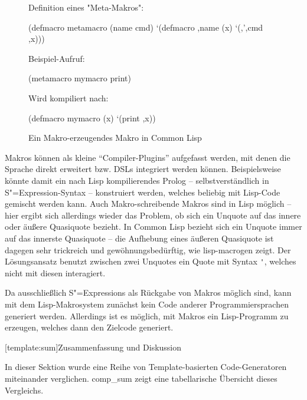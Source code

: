 \documentclass[11pt, a4paper, bibgerm]{scrbook}
\newenvironment{DIFnomarkup}{}{}
\newcommand\icode[1]{\lstinline?#1?}
\newcommand\lsection{}
\newcommand\abb{}
\newcommand{\sexp}{S"=Expression}
\newcommand{\sexps}{S"=Expressions}
\begin{document}
\begin{figure}[h]
  \centering
  \begin{DIFnomarkup}\begin{code}
Definition eines "Meta-Makros":

(defmacro metamacro (name cmd)
  `(defmacro ,name (x)
     `(,',cmd ,x)))    

Beispiel-Aufruf:

(metamacro mymacro print)

Wird kompiliert nach:

(defmacro mymacro (x)
  `(print ,x))
  \end{code}\end{DIFnomarkup}
  \caption{Ein Makro-erzeugendes Makro in Common Lisp}
  \label{magicl:fig:lisp-macrogen}
\end{figure}

Makros können als kleine "`Compiler-Plugins"' aufgefasst werden, mit
denen die Sprache direkt erweitert bzw. DSLs integriert werden
können. Beispielsweise könnte damit ein nach Lisp kompilierendes
Prolog \cite[S.388ff]{NorvigCL} -- selbstverständlich in \sexp{}-Syntax --
konstruiert werden, welches beliebig mit Lisp-Code gemischt werden
kann. Auch Makro-schreibende Makros sind in Lisp möglich -- hier ergibt
sich allerdings wieder das Problem, ob sich ein Unquote auf das innere
oder äußere Quasiquote bezieht. In Common Lisp bezieht sich ein Unquote
immer auf das innerste Quasiquote -- die Aufhebung eines äußeren
Quasiquote ist dagegen sehr trickreich und gewöhnungsbedürftig, wie
\abb{lisp-macrogen} zeigt. Der Lösungsansatz benutzt zwischen zwei
Unquotes ein Quote mit Syntax \icode{'}, welches nicht mit diesen
interagiert.

Da ausschließlich \sexps{} als Rückgabe von Makros möglich sind, kann
mit dem Lisp-Makrosystem zunächst kein Code anderer Programmiersprachen
generiert werden. Allerdings ist es möglich, mit Makros ein
Lisp-Programm zu erzeugen, welches dann den Zielcode generiert.

\lsection[template:sum]{Zusammenfassung und Diskussion}

In dieser Sektion wurde eine Reihe von Template-basierten
Code-Generatoren miteinander verglichen. \abb{comp_sum} zeigt eine
tabellarische Übersicht dieses Vergleichs. 
\end{document}
